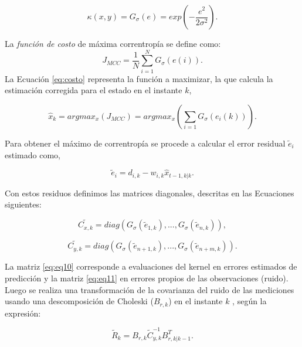 \begin{equation}
\kappa(x, y) = G_{\sigma} (e) = exp \left(-\dfrac{e^2}{2\sigma^2} \right).
\label{eq:eqkappa}
\end{equation}

La \textit{funci\'on de costo} de m\'axima correntrop\'ia se define como:
\begin{equation}
J_{MCC} = \dfrac{1}{N} \sum_{i=1}^N G_{\sigma} (e (i)).
\label{eq:costo}
\end{equation}
La Ecuaci\'on \ref{eq:costo} representa la funci\'on a maximizar, la que calcula la estimaci\'on corregida para el estado en el instante $k$,

\begin{equation}
\hat{x}_k = arg max_{x} (J_{MCC})= argmax_x (\sum_{i=1} G_{\sigma} (e_i(k))).
\label{eq:max}
\end{equation}
\bigskip

Para obtener el m\'aximo de correntrop\'ia se procede a calcular el error residual $\tilde{e}_i$ estimado como,

\begin{equation}
\tilde{e}_i = d_{i,k} - w_{i,k} \hat{x}_{t-1, k|k}.
\label{eq:eq9}
\end{equation}

Con estos residuos definimos las matrices diagonales, descritas en las Ecuaciones siguientes: 
\bigskip

\begin{equation}
\tilde{C_{x, k}}= diag(G_{\sigma}(\tilde{e}_{1, k}),..., G_{\sigma}(\tilde{e}_{n, k})),
\label{eq:eq10}
\end{equation}

\begin{equation}
\tilde{C_{y, k}}= diag(G_{\sigma}(\tilde{e}_{n+1, k}),..., G_{\sigma}(\tilde{e}_{n+m, k})).
\label{eq:eq11}
\end{equation}

La matriz \ref{eq:eq10} corresponde a evaluaciones del kernel en errores estimados de predicci\'on y la matriz \ref{eq:eq11} en errores propios de las observaciones (ruido). Luego se realiza una transformaci\'on de la covarianza del ruido de las mediciones usando una descomposici\'on de Choleski ($B_{r, k}$) en el instante $k$ \cite{chen}, seg\'un la expresi\'on:
\bigskip
 
\begin{equation}
\tilde{R}_k = B_{r, k} \tilde{C}_{y, k}^{-1}B_{r, k|k-1}^T.
\label{eq:eq12}
\end{equation}

